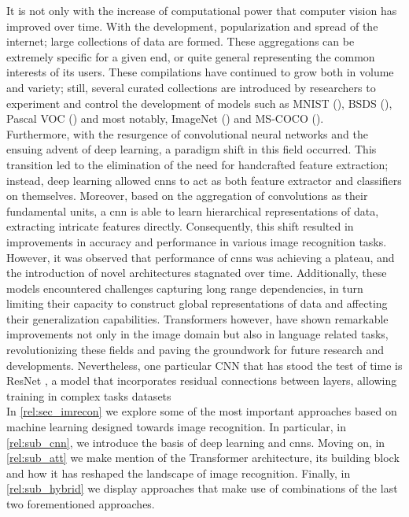\noindent It is not only with the increase of computational power that computer vision has improved 
over time. With the development, popularization and spread of the internet; large collections of 
data are formed. These aggregations can be extremely specific for a given end, or quite general 
representing the common interests of its users. These compilations have continued to 
grow both in volume and variety; still, several curated collections are introduced by researchers 
to experiment and control the development of models such as MNIST (\cite{lecun1998gradient}), 
BSDS (\cite{MartinFTM01}), Pascal VOC (\cite{pascal-voc-2012}) and most notably, 
ImageNet (\cite{ILSVRC15}) and MS-COCO (\cite{lin2014microsoft}).\\

\noindent Furthermore, with the resurgence of convolutional neural networks and the ensuing advent 
of deep learning, a paradigm shift in this field occurred. This transition led to the elimination 
of the need for handcrafted feature extraction; instead, deep learning allowed \glspl{cnn} to act 
as both feature extractor and classifiers on themselves. Moreover, based on the aggregation of 
convolutions as their fundamental units, a \gls{cnn} is able to learn hierarchical 
representations of data, extracting intricate features directly. 
Consequently, this shift resulted in improvements in accuracy and performance in various image 
recognition tasks.\\

\noindent However, it was observed that performance of \glspl{cnn} was achieving a plateau, and 
the introduction of novel architectures stagnated over time. Additionally, these models encountered 
challenges capturing long range dependencies, in turn  limiting their capacity to construct global 
representations of data and affecting their generalization capabilities. Transformers however, have 
shown remarkable improvements not only in the image domain but also in language related tasks, 
revolutionizing these fields and paving the groundwork for future research and developments. Nevertheless,
one particular CNN that has stood the test of time is ResNet \autocite{he2016deep}, a model that 
incorporates residual connections between layers, allowing training in complex tasks datasets\\

\noindent In \autoref{rel:sec_imrecon} we explore some of the most important approaches based 
on machine learning designed towards image recognition. In particular, in \autoref{rel:sub_cnn}, we 
introduce the basis of deep learning and \glspl{cnn}. Moving on, in \autoref{rel:sub_att} we make 
mention of the Transformer architecture, its building block and how it has reshaped the landscape 
of image recognition. Finally, in \autoref{rel:sub_hybrid} we display approaches that make use of 
combinations of the last two forementioned approaches.\\


